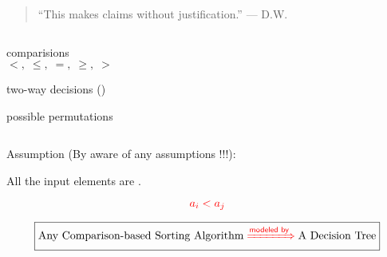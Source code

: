 \begin{frame}{}


  \pause
  \vspace{0.30cm}
  \begin{quote}
    \centering
    ``This makes claims without justification.'' \hfill --- D.W.
  \end{quote}
\end{frame}

\begin{frame}{}
  \begin{center}
    {\Large {}} 

    \pause
    \vspace{0.80cm}
    \begin{columns}
	\begin{description}[Leaves:]
	  \item[Nodes:] comparisions 
	    \[
	      <,\; \le,\; =,\; \ge,\; >
	    \]
	  \item[Edges:] two-way decisions ()
	  \item[Leaves:] possible permutations
	\end{description}
    \end{columns}

    \pause
    \vspace{0.60cm}
    \begin{alertblock}{Assumption (By aware of any assumptions !!!):}
      \centerline{All the input elements are .}
      \[
	\textcolor{red}{a_i < a_j}
      \]
    \end{alertblock}
  \end{center}
\end{frame}

\begin{frame}{}
  \begin{center}
    {\Large {}} 
  \end{center}

  \vspace{-0.40cm}
  \[
    \boxed{\text{Any Comparison-based Sorting Algorithm} \;\textcolor{red}{\xRightarrow{ \textsf{modeled by} }}\; \text{A Decision Tree}}
  \]


\end{frame}

